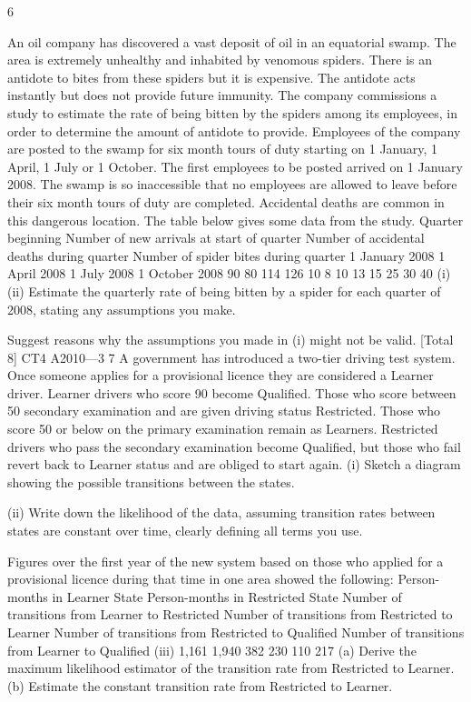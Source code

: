 6
 
An oil company has discovered a vast deposit of oil in an equatorial swamp.
The area is extremely unhealthy and inhabited by venomous spiders. There is
an antidote to bites from these spiders but it is expensive. The antidote acts
instantly but does not provide future immunity. The company commissions a
study to estimate the rate of being bitten by the spiders among its employees, in
order to determine the amount of antidote to provide.
Employees of the company are posted to the swamp for six month tours of duty
starting on 1 January, 1 April, 1 July or 1 October. The first employees to be posted
arrived on 1 January 2008. The swamp is so inaccessible that no employees are
allowed to leave before their six month tours of duty are completed.
Accidental deaths are common in this dangerous location.
The table below gives some data from the study.
Quarter
beginning Number of new
arrivals at start
of quarter Number of
accidental deaths
during quarter Number of
spider bites
during quarter
1 January 2008
1 April 2008
1 July 2008
1 October 2008 90
80
114
126 10
8
10
13 15
25
30
40
(i)
(ii)
Estimate the quarterly rate of being bitten by a spider for each quarter of
2008, stating any assumptions you make.
 
Suggest reasons why the assumptions you made in (i) might not be valid.  
[Total 8]
CT4 A2010—3
7
A government has introduced a two-tier driving test system. Once someone applies
for a provisional licence they are considered a Learner driver. Learner drivers who
score 90%
become Qualified. Those who score between 50%
secondary examination and are given driving status Restricted. Those who score 50%
or below on the primary examination remain as Learners. Restricted drivers who pass
the secondary examination become Qualified, but those who fail revert back to
Learner status and are obliged to start again.
(i) Sketch a diagram showing the possible transitions between the states.
 
(ii) Write down the likelihood of the data, assuming transition rates between states
are constant over time, clearly defining all terms you use.
 
Figures over the first year of the new system based on those who applied for a
provisional licence during that time in one area showed the following:
Person-months in Learner State
Person-months in Restricted State
Number of transitions from Learner to Restricted
Number of transitions from Restricted to Learner
Number of transitions from Restricted to Qualified
Number of transitions from Learner to Qualified
(iii)
1,161
1,940
382
230
110
217
(a) Derive the maximum likelihood estimator of the transition rate from
Restricted to Learner.
(b) Estimate the constant transition rate from Restricted to Learner.
 
